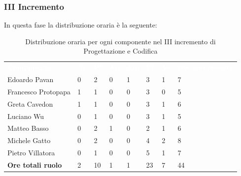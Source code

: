 \subsubsection{III Incremento}
In questa fase la distribuzione oraria è la seguente:
\begin{table}[H]
\begin{center}
\renewcommand{\arraystretch}{1.25}
\begin{tabular}{ m{}<{\centering}  m{}<{\centering} m{}<{\centering} m{}<{\centering}  m{}<{\centering}  m{}<{\centering}  m{}<{\centering}  m{}<{\centering}   }
	\rowcolor{darkblue}
	\textcolor{white}{\textbf{Componente}} &\textcolor{white}{\textbf{Re}}&\textcolor{white}{\textbf{Pt}}&\textcolor{white}{\textbf{An}}&\textcolor{white}{\textbf{Am}}&\textcolor{white}{\textbf{Pr}}&\textcolor{white}{\textbf{Ve}}&\textcolor{white}{\textbf{Ore complessive}}\\ 
	Edoardo Pavan & 0 & 2 & 0 & 1 & 3 & 1 & 7 \\	
	
	Francesco Protopapa & 1 & 1 & 0 & 0 & 3 & 0 & 5 \\

	Greta Cavedon & 1 & 1 & 0 & 0 & 3 & 1 & 6 \\
	
	Luciano Wu & 0 & 1 & 0 & 0 & 3 & 1 & 5 \\
	
	Matteo Basso & 0 & 2 & 1 & 0 & 2 & 1 & 6 \\
	
	Michele Gatto & 0 & 2 & 0 & 0 & 4 & 2 & 8 \\
	
	Pietro Villatora & 0 & 1 & 0 & 0 & 5 & 1 & 7 \\
	
	\textbf{Ore totali ruolo} & 2 & 10 & 1 & 1 & 23 & 7 & 44 \\

\end{tabular}
\caption{Distribuzione oraria per ogni componente nel III incremento di Progettazione e Codifica}
\end{center}
\end{table}

